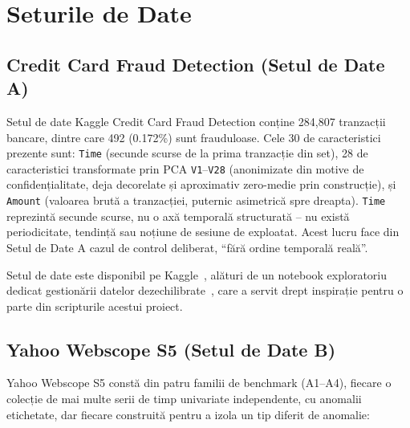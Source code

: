 \section{Seturile de Date}
\label{sec:datasets-overview}

\subsection{Credit Card Fraud Detection (Setul de Date A)}

Setul de date Kaggle Credit Card Fraud Detection conține 284{,}807 tranzacții bancare, dintre care 492 (0.172\%) sunt frauduloase.
Cele 30 de caracteristici prezente sunt: \texttt{Time} (secunde scurse de la prima tranzacție din set), 28 de caracteristici transformate prin PCA \texttt{V1}--\texttt{V28} (anonimizate din motive de confidențialitate, deja decorelate și aproximativ zero-medie prin construcție), și \texttt{Amount} (valoarea brută a tranzacției, puternic asimetrică spre dreapta).
\texttt{Time} reprezintă secunde scurse, nu o axă temporală structurată -- nu există periodicitate, tendință sau noțiune de sesiune de exploatat. Acest lucru face din Setul de Date A cazul de control deliberat, \enquote{fără ordine temporală reală}.

Setul de date este disponibil pe Kaggle~\cite{kaggle_creditcard}, alături de un notebook exploratoriu dedicat gestionării datelor dezechilibrate~\cite{kaggle_janiobachmann}, care a servit drept inspirație pentru o parte din scripturile acestui proiect.

\subsection{Yahoo Webscope S5 (Setul de Date B)}

Yahoo Webscope S5 constă din patru familii de benchmark (A1--A4), fiecare o colecție de mai multe serii de timp univariate independente, cu anomalii etichetate, dar fiecare construită pentru a izola un tip diferit de anomalie:

\begin{center}
\end{center}

